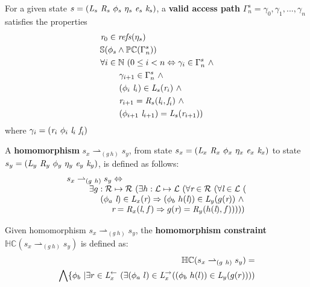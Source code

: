 \begin{definition}
For a given state $s= ( \cfgnt{L}_s\ \cfgnt{R}_s\ \phi_s\ \eta_s\ \cfgnt{e}_s\ \cfgnt{k}_s )$, a \textbf{valid access path} $\Gamma_n^s = \gamma_0,\gamma_1,...,\gamma_n$ satisfies the properties
\begin{align*}
\cfgnt{r}_0 &\in \mathit{refs}(\eta_s) \\
\mathbb{S}(&\phi_s \wedge \mathbb{PC}(\Gamma_n^s)) \\
\forall i & \in \mathbb{N}\ ( 0 \leq i < n \Leftrightarrow \gamma_i \in \Gamma_n^s\  \wedge\\
&\ \ \ \  \gamma_{i+1} \in \Gamma_n^s\  \wedge\\
&\ \ \ \  (\phi_i\ \cfgnt{l}_i)\in \cfgnt{L}_s(\cfgnt{r}_i)\ \wedge \\
&\ \ \ \  \cfgnt{r}_{i+1} = \cfgnt{R}_s(\cfgnt{l}_i,\cfgnt{f}_i)\ \wedge\\
&\ \ \ \ (\phi_{i+1}\ \cfgnt{l}_{i+1}) = \cfgnt{L}_s(\cfgnt{r}_{i+1}) )
\end{align*}
where $\gamma_i = (\emph{r}_i\ \phi_i\ \emph{l}_i\ \emph{f}_i)$
\end{definition}

\begin{definition}
A \textbf{homomorphism} $s_x \rightharpoonup_{(g\ h)} s_y$, from state $s_x = ( \cfgnt{L}_x\ \cfgnt{R}_x\ \phi_x\ \eta_x\ \cfgnt{e}_x\ \cfgnt{k}_x )$ to state $s_y = ( \cfgnt{L}_y\ \cfgnt{R}_y\ \phi_y\ \eta_y\ \cfgnt{e}_y\ \cfgnt{k}_y )$, is defined as follows: 
$$
\begin{array}{l}
 s_x \rightharpoonup_{(g\ h)} s_y \Leftrightarrow \\
\ \ \ \ \ \ \ \ \exists g:\mathcal{R} \mapsto \mathcal{R}\ ( \exists h: \mathcal{L} \mapsto \mathcal{L}\ (\forall \cfgnt{r} \in \mathcal{R}\ (\forall \cfgnt{l} \in \mathcal{L}\ ( \\ 
\ \ \ \ \ \ \ \ \ \ \ \ (\phi_a\ \cfgnt{l}) \in \cfgnt{L}_x(\cfgnt{r}) \Rightarrow (\phi_b\ h(\cfgnt{l}))\in \cfgnt{L}_y(g(\cfgnt{r}))\ \wedge \\
\ \ \ \ \ \ \ \ \ \ \ \ \ \ \ \ \cfgnt{r} = \cfgnt{R}_x(\cfgnt{l},f) \Rightarrow g(\cfgnt{r}) = \cfgnt{R}_y(h(\cfgnt{l}),f) )) )) 
\end{array}
$$
\end{definition}

\begin{definition}
\label{def:hc}
Given homomorphism $s_x \rightharpoonup_{(g\ h)} s_y$, the \textbf{homomorphism constraint} $\mathbb{HC}(s_x \rightharpoonup_{(g\ h)} s_y)$ is defined as:
\begin{align*}
\mathbb{HC}(s_x \rightharpoonup_{(g\ h)} s_y) = \\
 \bigwedge \{ \phi_b\ | \exists r \in \emph{L}_x^\leftarrow\ (\exists (\phi_a\ l) \in \emph{L}_x^\rightarrow ( (\phi_b\ h(l)) \in \emph{L}_y (g(r)))) 
\end{align*}
\end{definition}

